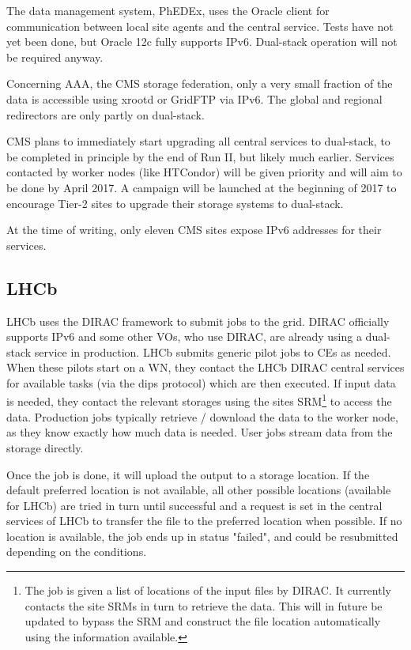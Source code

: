 \documentclass[a4paper]{jpconf}
\begin{document}
The data management system, PhEDEx, uses the Oracle client for
communication between local site agents and the central service. Tests
have not yet been done, but Oracle 12c fully supports IPv6. Dual-stack
operation will not be required anyway.

Concerning AAA, the CMS storage federation, only a very small fraction
of the data is accessible using xrootd or GridFTP via IPv6. The global
and regional redirectors are only partly on dual-stack.

CMS plans to immediately start upgrading all central services to
dual-stack, to be completed in principle by the end of Run II, but
likely much earlier. Services contacted by worker nodes (like
HTCondor) will be given priority and will aim to be done by April
2017. A campaign will be launched at the beginning of 2017 to
encourage Tier-2 sites to upgrade their storage systems to dual-stack.

At the time of writing, only eleven CMS sites expose IPv6 addresses
for their services.

\subsection{LHCb}
LHCb uses the DIRAC framework to submit jobs to the grid. DIRAC
officially supports IPv6 and some other VOs, who use DIRAC, are
already using a dual-stack service in production.  LHCb submits
generic pilot jobs to CEs as needed. When these pilots start on a WN,
they contact the LHCb DIRAC central services for available tasks (via
the dips protocol) which are then executed. If input data is needed,
they contact the relevant storages using the sites SRM\footnote{The
  job is given a list of locations of the input files by DIRAC. It
  currently contacts the site SRMs in turn to retrieve the data. This
  will in future be updated to bypass the SRM and construct the file
  location automatically using the information available.} to access
the data.  Production jobs typically retrieve / download the data to
the worker node, as they know exactly how much data is needed. User
jobs stream data from the storage directly.

Once the job is done, it will upload the output to a storage
location. If the default preferred location is not available, all
other possible locations (available for LHCb) are tried in turn until
successful and a request is set in the central services of LHCb to
transfer the file to the preferred location when possible. If no
location is available, the job ends up in status "failed", and could
be resubmitted depending on the conditions.
\end{document}
